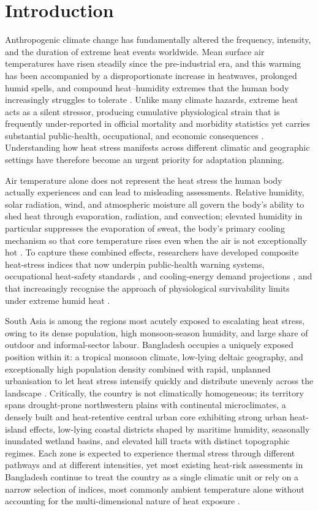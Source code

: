 \documentclass[review,11pt]{elsarticle}
\begin{document}
\section{Introduction}\label{sec:intro}
Anthropogenic climate change has fundamentally altered the frequency, intensity,
and the duration of extreme heat events worldwide. Mean surface air temperatures have
risen steadily since the pre-industrial era, and this warming has been accompanied
by a disproportionate increase in heatwaves, prolonged humid spells, and compound
heat--humidity extremes that the human body increasingly struggles to tolerate
\citep{Shaw2022IPCCAsia}. Unlike many climate hazards, extreme heat acts as a
silent stressor, producing cumulative physiological strain that is frequently
under-reported in official mortality and morbidity statistics yet carries
substantial public-health, occupational, and economic consequences
\citep{Kjellstrom2019}. Understanding how heat stress manifests across different
climatic and geographic settings have therefore become an urgent priority for
adaptation planning.

Air temperature alone does not represent the heat stress the human body actually
experiences and can lead to misleading assessments. Relative humidity, solar
radiation, wind, and atmospheric moisture all govern the body's ability to shed
heat through evaporation, radiation, and convection; elevated humidity in
particular suppresses the evaporation of sweat, the body's primary cooling
mechanism so that core temperature rises even when the air is not exceptionally
hot \citep{steadman1979}. To capture these combined effects, researchers have
developed composite heat-stress indices that now underpin public-health warning
systems, occupational heat-safety standards \citep{iso7243_2017}, and cooling-energy
demand projections \citep{spinoni2018}, and that increasingly recognise the
approach of physiological survivability limits under extreme humid heat
\citep{raymond2020}.

South Asia is among the regions most acutely exposed to escalating heat stress,
owing to its dense population, high monsoon-season humidity, and large share of
outdoor and informal-sector labour. Bangladesh occupies a uniquely exposed
position within it: a tropical monsoon climate, low-lying deltaic geography, and
exceptionally high population density combined with rapid, unplanned urbanisation
to let heat stress intensify quickly and distribute unevenly across the landscape
\citep{Sultana2021}. Critically, the country is not climatically homogeneous; its
territory spans drought-prone northwestern plains with continental microclimates,
a densely built and heat-retentive central urban core exhibiting strong urban
heat-island effects, low-lying coastal districts shaped by maritime humidity,
seasonally inundated wetland basins, and elevated hill tracts with distinct
topographic regimes. Each zone is expected to experience thermal stress through
different pathways and at different intensities, yet most existing heat-risk
assessments in Bangladesh continue to treat the country as a single climatic unit
or rely on a narrow selection of indices, most commonly ambient temperature
alone without accounting for the multi-dimensional nature of heat exposure
\citep{Abrar2022}.
\end{document}
